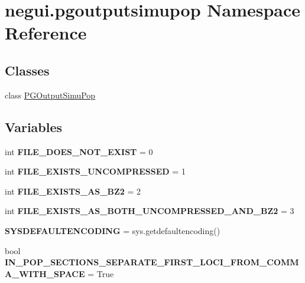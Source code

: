 \hypertarget{namespacenegui_1_1pgoutputsimupop}{}\section{negui.\+pgoutputsimupop Namespace Reference}
\label{namespacenegui_1_1pgoutputsimupop}
\subsection*{Classes}
\begin{DoxyCompactItemize}
\item 
class \hyperlink{classnegui_1_1pgoutputsimupop_1_1PGOutputSimuPop}{P\+G\+Output\+Simu\+Pop}
\end{DoxyCompactItemize}
\subsection*{Variables}
\begin{DoxyCompactItemize}
\item 
int {\bfseries F\+I\+L\+E\+\_\+\+D\+O\+E\+S\+\_\+\+N\+O\+T\+\_\+\+E\+X\+I\+ST} = 0\hypertarget{namespacenegui_1_1pgoutputsimupop_a8dce2602642103765ca0779261e6451f}{}\label{namespacenegui_1_1pgoutputsimupop_a8dce2602642103765ca0779261e6451f}

\item 
int {\bfseries F\+I\+L\+E\+\_\+\+E\+X\+I\+S\+T\+S\+\_\+\+U\+N\+C\+O\+M\+P\+R\+E\+S\+S\+ED} = 1\hypertarget{namespacenegui_1_1pgoutputsimupop_aeafac2a7762cd0232f8237814d8bf1d8}{}\label{namespacenegui_1_1pgoutputsimupop_aeafac2a7762cd0232f8237814d8bf1d8}

\item 
int {\bfseries F\+I\+L\+E\+\_\+\+E\+X\+I\+S\+T\+S\+\_\+\+A\+S\+\_\+\+B\+Z2} = 2\hypertarget{namespacenegui_1_1pgoutputsimupop_a10fa3eadfffdde1856befd5812d7b4c0}{}\label{namespacenegui_1_1pgoutputsimupop_a10fa3eadfffdde1856befd5812d7b4c0}

\item 
int {\bfseries F\+I\+L\+E\+\_\+\+E\+X\+I\+S\+T\+S\+\_\+\+A\+S\+\_\+\+B\+O\+T\+H\+\_\+\+U\+N\+C\+O\+M\+P\+R\+E\+S\+S\+E\+D\+\_\+\+A\+N\+D\+\_\+\+B\+Z2} = 3\hypertarget{namespacenegui_1_1pgoutputsimupop_a49aed528f691ead86587abc6ea1eab25}{}\label{namespacenegui_1_1pgoutputsimupop_a49aed528f691ead86587abc6ea1eab25}

\item 
{\bfseries S\+Y\+S\+D\+E\+F\+A\+U\+L\+T\+E\+N\+C\+O\+D\+I\+NG} = sys.\+getdefaultencoding()\hypertarget{namespacenegui_1_1pgoutputsimupop_a55f3fe89d1ed435842abbce32470eb8e}{}\label{namespacenegui_1_1pgoutputsimupop_a55f3fe89d1ed435842abbce32470eb8e}

\item 
bool {\bfseries I\+N\+\_\+\+P\+O\+P\+\_\+\+S\+E\+C\+T\+I\+O\+N\+S\+\_\+\+S\+E\+P\+A\+R\+A\+T\+E\+\_\+\+F\+I\+R\+S\+T\+\_\+\+L\+O\+C\+I\+\_\+\+F\+R\+O\+M\+\_\+\+C\+O\+M\+M\+A\+\_\+\+W\+I\+T\+H\+\_\+\+S\+P\+A\+CE} = True\hypertarget{namespacenegui_1_1pgoutputsimupop_a70bc36d88fb726c6b876e799be4f6196}{}\label{namespacenegui_1_1pgoutputsimupop_a70bc36d88fb726c6b876e799be4f6196}

\end{DoxyCompactItemize}


